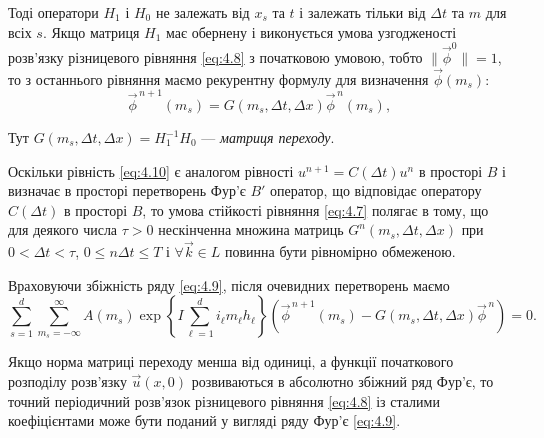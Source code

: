 Тоді оператори $H_1$ і $H_0$ не залежать від $x_s$ та $t$ і залежать тільки від $\Delta t$ та $m$ для всіх $s$. Якщо матриця $H_1$ має обернену і виконується умова узгодженості розв'язку різницевого рівняння \eqref{eq:4.8} з початковою умовою, тобто $\| \vec \phi^0 \| = 1$, то з останнього рівняння маємо рекурентну формулу для визначення $\vec \phi(m_s)$:
\begin{equation}
    \label{eq:4.10}
    \vec \phi^{\,n + 1} (m_s) = G(m_s, \Delta t, \Delta x) \vec \phi^{\,n}(m_s),
\end{equation}

\begin{definition}
    Тут $G(m_s, \Delta t, \Delta x) = H_1^{-1} H_0$ --- \emph{матриця переходу}.
\end{definition}

Оскільки рівність \eqref{eq:4.10} є аналогом рівності $u^{n + 1} = C(\Delta t) u^n$ в просторі $B$ і визначає в просторі перетворень Фур'є $B'$ оператор, що відповідає оператору $C(\Delta t)$ в просторі $B$, то умова стійкості рівняння \eqref{eq:4.7} полягає в тому, що для деякого числа $\tau > 0$ нескінченна множина матриць $G^n(m_s, \Delta t, \Delta x)$ при $0 < \Delta t < \tau$, $0 \le n \Delta t \le T$ і $\forall \vec k \in L$ повинна бути рівномірно обмеженою. \medskip

Враховуючи збіжність ряду \eqref{eq:4.9}, після очевидних перетворень маємо
\begin{equation*}
    \sum_{s = 1}^d \sum_{m_s = -\infty}^\infty A(m_s) \exp \left\{ I \sum_{\ell = 1}^d i_\ell m_\ell h_\ell \right\} \left( \vec \phi^{\,n + 1} (m_s) - G(m_s, \Delta t, \Delta x) \vec \phi^{\,n} \right) = 0.
\end{equation*} 

\begin{theorem}
    Якщо норма матриці переходу менша від одиниці, а функції початкового розподілу розв'язку $\vec u(x, 0)$ розвиваються в абсолютно збіжний ряд Фур'є, то точний періодичний розв'язок різницевого рівняння \eqref{eq:4.8} із сталими коефіцієнтами може бути поданий у вигляді ряду Фур'є \eqref{eq:4.9}.
\end{theorem}

